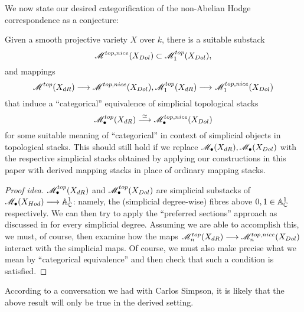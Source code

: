 \documentclass[11pt]{amsart}
\begin{document}
We now state our desired categorification of the non-Abelian Hodge
correspondence as a conjecture:

\begin{cnj}
Given a smooth projective variety $X$ over $k$, there is a suitable substack
\[
\mathscr{M}^{top, nice}(X_{Dol}) \subset \mathscr{M}_1^{top}(X_{Dol}),
\]
and mappings
\[
\sM^{top}(X_{dR}) \to \sM^{top, nice}(X_{Dol}),
\sM_1^{top}(X_{dR}) \to \sM_1^{top, nice}(X_{Dol})
\]
that induce a ``categorical'' equivalence of simplicial topological stacks
\[
\sM^{top}_{\bullet}(X_{dR}) \to[\simeq] \sM^{top, nice}_{\bullet}(X_{Dol})
\]
for some suitable meaning of ``categorical'' in context of simplicial objects
in topological stacks. This should still hold if we
replace $\mathscr{M}_\bullet(X_{dR}), \mathscr{M}_\bullet(X_{Dol})$ with
the respective simplicial stacks obtained by applying our constructions
in this paper with derived mapping stacks in place of ordinary mapping stacks.
\end{cnj}
\begin{proof}[Proof idea]
$\mathscr{M}_\bullet^{top}(X_{dR})$
and $\mathscr{M}_\bullet^{top}(X_{Dol})$ are simplicial substacks of
$\sM_\bullet(X_{Hod}) \to \bA^1_\bC$: namely, the (simplicial degree-wise)
fibres above $0, 1 \in \mathbb{A}^1_\mathbb{C}$ respectively. We can then try to apply the
``preferred sections'' approach as discussed in \cite[\S 4]{NonAbHodgeFilt}
for every simplicial degree. Assuming we are able to accomplish this,
we must, of course, then examine how the maps
$\sM_n^{top}(X_{dR}) \to \sM_n^{top, nice}(X_{Dol})$ interact with the
simplicial maps. Of course, we must also make precise what we mean by
``categorical equivalence'' and then check that such a condition is satisfied.
\end{proof}

\begin{rmk}
According to a conversation we had with Carlos Simpson, it is likely that the
above result will only be true in the derived setting.
\end{rmk}

\printbibliography
\end{document}
